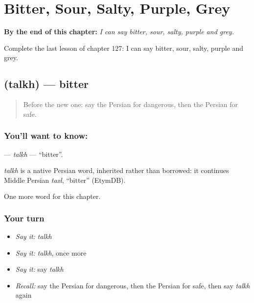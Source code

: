 
\chapter{Bitter, Sour, Salty, Purple, Grey}
\label{ch:fa-bitter-sour-salty-purple-grey}

\begin{chapteropening}
\textbf{By the end of this chapter:} \emph{I can say bitter, sour, salty, purple and grey.}

Complete the last lesson of chapter 127: I can say bitter, sour, salty, purple and grey.
\end{chapteropening}

\section[\texorpdfstring{\fa{تلخ} (talkh)}{تلخ (talkh)}]{ (talkh) — bitter}

\label{lesson:FA-C127-talkh}



\begin{quote}
Before the new one: say the Persian for dangerous, then the Persian for safe.
\end{quote}

\subsection*{You'll want to know: }
\textbf{} — \emph{talkh} — \textquotedblleft{}bitter\textquotedblright{}.

\begin{cousinweb}
\emph{talkh} is a native Persian word, inherited rather than borrowed: it continues Middle Persian \emph{taxl}, \textquotedblleft{}bitter\textquotedblright{} (EtymDB).
\end{cousinweb}

\begin{grammarlens}[title={What you've built}]
One more word for this chapter.
\end{grammarlens}

\subsection*{Your turn}
\begin{itemize}
\raggedright
  \item \emph{Say it:} \emph{talkh}
  \item \emph{Say it:} \emph{talkh}, once more
  \item \emph{Say it:} say \emph{talkh}
  \item \emph{Recall:} say the Persian for dangerous, then the Persian for safe, then say \emph{talkh} again
\end{itemize}

